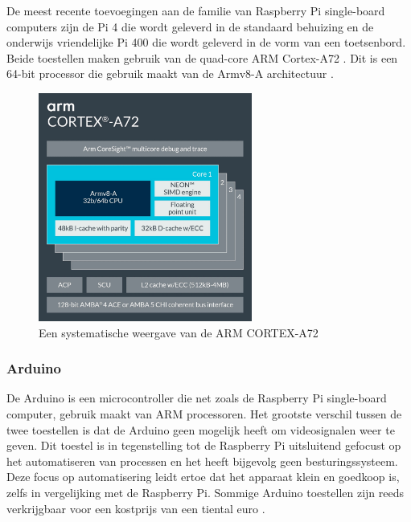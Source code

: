 De meest recente toevoegingen aan de familie van Raspberry Pi single-board computers zijn de Pi 4 die wordt geleverd in de standaard behuizing en de onderwijs vriendelijke Pi 400 die wordt geleverd in de vorm van een toetsenbord. Beide toestellen maken gebruik van de quad-core ARM Cortex-A72 \autocite{Pi2022}. Dit is een 64-bit processor die gebruik maakt van de Armv8-A architectuur \autocite{armDeveloper2022}.

\begin{figure}[!h]
    \centering
    \includegraphics[width=70mm, scale=0.5]{img/Cortex-A72.jpg}
    \caption{Een systematische weergave van de ARM CORTEX-A72 \autocite{armDeveloper2022}}
\end{figure}

\subsubsection{Arduino}
De Arduino is een microcontroller die net zoals de Raspberry Pi single-board computer, gebruik maakt van ARM processoren. Het grootste verschil tussen de twee toestellen is dat de Arduino geen mogelijk heeft om videosignalen weer te geven. Dit toestel is in tegenstelling tot de Raspberry Pi uitsluitend gefocust op het automatiseren van processen en het heeft bijgevolg geen besturingssysteem. Deze focus op automatisering leidt ertoe dat het apparaat klein en goedkoop is, zelfs in vergelijking met de Raspberry Pi. Sommige Arduino toestellen zijn reeds verkrijgbaar voor een kostprijs van een tiental euro \autocite{Arduino2018}. 

